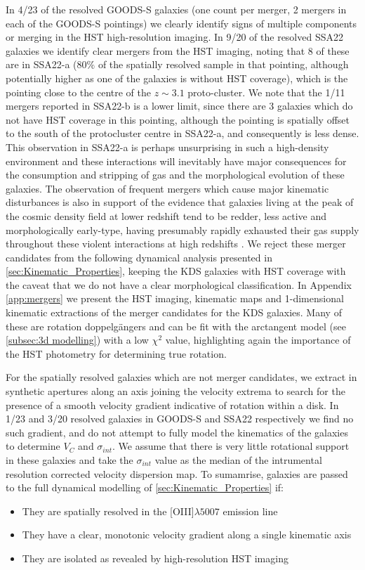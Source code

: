 \documentclass[fleqn,usenatbib]{mn2e}
\begin{document}
In 4/23 of the resolved GOODS-S galaxies (one count per merger, 2 mergers in each of the GOODS-S pointings) we clearly identify signs of multiple components or merging in the HST high-resolution imaging.
In 9/20 of the resolved SSA22 galaxies we identify clear mergers from the HST imaging, noting that 8 of these are in SSA22-a (80$\%$ of the spatially resolved sample in that pointing, although potentially higher as one of the galaxies is without HST coverage), which is the pointing close to the centre of the $z \sim 3.1$ proto-cluster.
We note that the 1/11 mergers reported in SSA22-b is a lower limit, since there are 3 galaxies which do not have HST coverage in this pointing, although the pointing is spatially offset to the south of the protocluster centre in SSA22-a, and consequently is less dense.
This observation in SSA22-a is perhaps unsurprising in such a high-density environment and these interactions will inevitably have major consequences for the consumption and stripping of gas and the morphological evolution of these galaxies.
The observation of frequent mergers which cause major kinematic disturbances is also in support of the evidence that galaxies living at the peak of the cosmic density field at lower redshift tend to be redder, less active and morphologically early-type, having presumably rapidly exhausted their gas supply throughout these violent interactions at high redshifts \citep[e.g.][]{Steidel1998,White2007,Kodama2007,Zheng2009}.  
We reject these merger candidates from the following dynamical analysis presented in \cref{sec:Kinematic_Properties}, keeping the KDS galaxies with HST coverage with the caveat that we do not have a clear morphological classification.
In Appendix \cref{app:mergers} we present the HST imaging, kinematic maps and 1-dimensional kinematic extractions of the merger candidates for the KDS galaxies.
Many of these are rotation doppelg{\"a}ngers and can be fit with the arctangent model (see \cref{subsec:3d modelling}) with a low $\chi ^{2}$ value, highlighting again the importance of the HST photometry for determining true rotation.

For the spatially resolved galaxies which are not merger candidates, we extract in synthetic apertures along an axis joining the velocity extrema to search for the presence of a smooth velocity gradient indicative of rotation within a disk.
In 1/23 and 3/20 resolved galaxies in GOODS-S and SSA22 respectively we find no such gradient, and do not attempt to fully model the kinematics of the galaxies to determine $V_{C}$ and $\sigma_{int}$.
We assume that there is very little rotational support in these galaxies and take the $\sigma_{int}$ value as the median of the intrumental resolution corrected velocity dispersion map.
To sumamrise, galaxies are passed to the full dynamical modelling of \cref{sec:Kinematic_Properties} if:
\begin{itemize}
    \item They are spatially resolved in the [OIII]$\lambda5007$ emission line
    \item They have a clear, monotonic velocity gradient along a single kinematic axis
    \item They are isolated as revealed by high-resolution HST imaging
\end{itemize}
\end{document}
